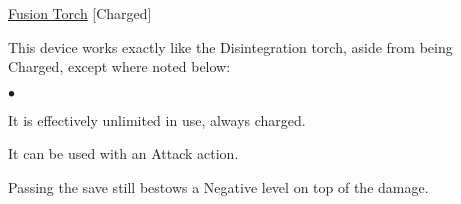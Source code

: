\medskip\noindent\underline{Fusion Torch} [Charged] 

\noindent This device works exactly like the Disintegration torch, aside from being Charged, except where noted below: 

\begin{list}{$\bullet$}{\itemspace}
\item It is effectively unlimited in use, always charged. 
\item It can be used with an Attack action. 
\item Passing the save still bestows a Negative level on top of the damage.
\end{list}